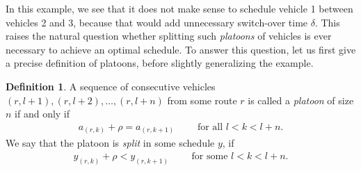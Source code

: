 \documentclass[a4paper]{report}
\theoremstyle{definition}
\newtheorem{define}{Definition}[chapter]
\theoremstyle{plain}
\begin{document}
In this example, we see that it does not make sense to schedule vehicle 1
between vehicles 2 and 3, because that would add unnecessary switch-over time
$\delta$. This raises the natural question whether splitting such \textit{platoons} of
vehicles is ever necessary to achieve an optimal schedule. To answer this
question, let us first give a precise definition of platoons, before slightly
generalizing the example.
%
\begin{define}
  A sequence of consecutive vehicles $(r, l+1), (r, l+2), \dots, (r, l+n)$ from
  some route $r$ is called a \textit{platoon} of size $n$ if and only if
  \begin{align}
  a_{(r,k)} + \rho = a_{(r, k+1)}  \quad \quad \text{ for all } l < k < l + n.
  \end{align}
 We say that the platoon is \textit{split}
  in some schedule $y$, if
  \begin{align}
  y_{(r, k)} + \rho < y_{(r, k + 1)} \quad \quad \text{ for some } l < k < l + n.
  \end{align}
\end{define}
%
\end{document}
